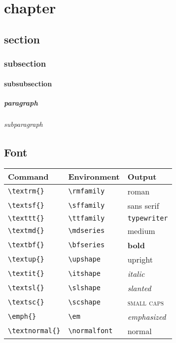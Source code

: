 \chapter{chapter}

\section{section}

\subsection{subsection}

\subsubsection{subsubsection}

\paragraph{paragraph}

\subparagraph{subparagraph}

\section{Font}

\begin{tabular}{l|l|l}
  Command              & Environment        & Output              \\\hline
  \verb|\textrm{}|     & \verb|\rmfamily|   & \textrm{roman}      \\
  \verb|\textsf{}|     & \verb|\sffamily|   & \textsf{sans serif} \\
  \verb|\texttt{}|     & \verb|\ttfamily|   & \texttt{typewriter} \\
  \verb|\textmd{}|     & \verb|\mdseries|   & \textmd{medium}     \\
  \verb|\textbf{}|     & \verb|\bfseries|   & \textbf{bold}       \\
  \verb|\textup{}|     & \verb|\upshape|    & \textup{upright}    \\
  \verb|\textit{}|     & \verb|\itshape|    & \textit{italic}     \\
  \verb|\textsl{}|     & \verb|\slshape|    & \textsl{slanted}    \\
  \verb|\textsc{}|     & \verb|\scshape|    & \textsc{small caps} \\
  \verb|\emph{}|       & \verb|\em|         & \emph{emphasized}   \\
  \verb|\textnormal{}| & \verb|\normalfont| & \textnormal{normal} \\
\end{tabular}


